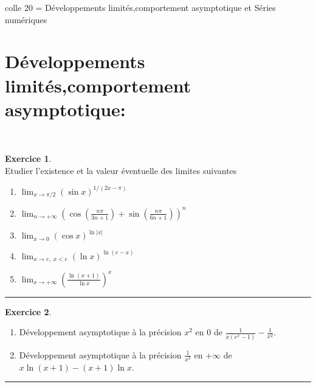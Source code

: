 \documentclass[a4paper,10pt]{article}
\theoremstyle{definition}
\theoremstyle{definition}
\newtheorem{exo}{Exercice}
\begin{document}
\medskip 	
	
	\begin{center}
		\Large \sc colle 20 = Développements limités,comportement asymptotique et Séries numériques
	\end{center}
\medskip 
\section*{Développements limités,comportement asymptotique:}\hfill\\%
\begin{minipage}{1\linewidth}
	\begin{minipage}[t]{0.48\linewidth}
		\raggedright
		
		
		
		\begin{exo}\quad\\[0.25cm]
			Etudier l'existence et la valeur éventuelle des limites suivantes
			\begin{enumerate}
				\item $\lim_{x\rightarrow \pi/2}(\sin x)^{1/(2x-\pi)}$
				\item $\lim_{n\rightarrow +\infty}\left(\cos(\frac{n\pi}{3n+1})+\sin(\frac{n\pi}{6n+1})\right)^n$
				\item $\lim_{x\rightarrow 0}(\cos x)^{\ln|x|}$
				\item $\lim_{x\rightarrow e,\;x<e}(\ln x)^{\ln(e-x)}$
				\item $\lim_{x\rightarrow +\infty}\left(\frac{\ln(x+1)}{\ln x}\right)^x$
			\end{enumerate}
			
			\centering
			\rule{1\linewidth}{0.6pt}
		\end{exo}
	
			\begin{exo}\quad\\[0.25cm]
			\begin{enumerate}
				\item  Développement asymptotique à la précision $x^2$ en $0$ de $\frac{1}{x(e^x-1)}-\frac{1}{x^2}$.
				\item  Développement asymptotique à la précision $\frac{1}{x^3}$ en $+\infty$ de $x\ln(x+1)-(x+1)\ln x$.
			\end{enumerate}	
		
		\centering
		\rule{1\linewidth}{0.6pt}
	\end{exo}	
	

		
		

\end{minipage}
\end{minipage}
\end{document}
